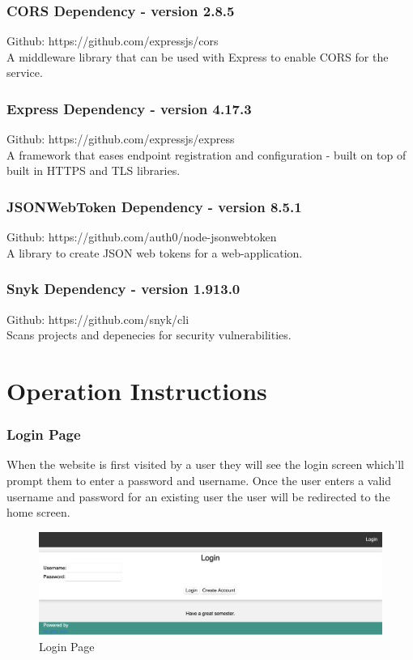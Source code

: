 \documentclass[12pt]{article}
\begin{document}
\subsubsection{CORS Dependency - version 2.8.5}
Github: https://github.com/expressjs/cors\\
A middleware library that can be used with Express to enable CORS for the service.

\subsubsection{Express Dependency - version 4.17.3}
Github: https://github.com/expressjs/express\\
A framework that eases endpoint registration and configuration - built on top of built in HTTPS and TLS libraries.

\subsubsection{JSONWebToken Dependency - version 8.5.1}
Github: https://github.com/auth0/node-jsonwebtoken\\
A library to create JSON web tokens for a web-application.

\subsubsection{Snyk Dependency - version 1.913.0}
Github: https://github.com/snyk/cli\\
Scans projects and depenecies for security vulnerabilities.

\section{Operation Instructions}
\subsubsection{Login Page}
When the website is first visited by a user they will see the login screen which'll prompt them to 
enter a password and username. Once the user enters a valid username and password for an existing user the 
user will be redirected to the home screen.
\begin{figure}[h!]
    \includegraphics[width=\linewidth]{LOGIN.png}
    \caption{Login Page}
\end{figure}
\end{document}
